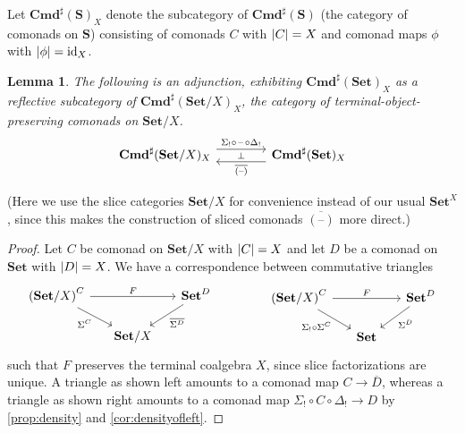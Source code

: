 \documentclass[11pt, oneside, article]{memoir}
\theoremstyle{plain}
\newtheorem{lemma}[theorem]{Lemma}
\theoremstyle{definition}
\theoremstyle{remark}
\DeclareMathOperator{\id}{id}
\DeclarePairedDelimiter{\abs}{\lvert}{\rvert}
\newcommand{\dash}{{\mathord{\text{--}}}}
\newcommand{\bang}{\mathrm{!}}
\newcommand{\namedcat}[1]{\mathbf{#1}}
\newcommand{\cat}[1]{\mathbf{#1}}
\newcommand{\Set}{\namedcat{Set}}
\newcommand{\Com}{\namedcat{Cmd}^\sharp}
\newcommand{\CoalgOn}[2]{{#2}^{#1}}
\newcommand{\CoalgSet}[1]{\CoalgOn{#1}{\Set}}
\newcommand{\clift}[1]{\overline{#1}}
\newcommand{\pts}[1]{{\abs{#1}}}
\newcommand{\qpts}[1]{\pts{#1}}
\newcommand{\one}[1]{\pts{#1}}
\newcommand{\ptlift}[1]{\overline{#1}}
\newcommand{\carr}{\Sigma}
\newcommand{\slicel}{\Sigma_\bang}
\newcommand{\slicer}{\Delta_\bang}
\newcommand{\car}[1]{\carr^{#1}}
\newcommand{\carC}{\car{\cC}}
\newcommand{\carD}{\car{\cD}}
\newcommand{\com}[2]{{#1}^{#2}}
\newcommand{\cmnd}[1]{{#1}}
\newcommand{\xX}{X}
\newcommand{\cC}{\cmnd{C}}
\newcommand{\cD}{\cmnd{D}}
\newcommand{\bS}{\cat{S}}
\newcommand{\DSet}{\CoalgSet{\cD}}
\newcommand{\slice}{slice}
\begin{document}
Let $\Com(\bS)_\xX$ denote the subcategory of $\Com(\bS)$ (the
category of comonads on $\bS$) consisting of comonads $\cC$ with
$\qpts{\cC} = \xX$ and comonad maps $\phi$ with
$\one{\phi} = \id_\xX$.

\begin{lemma}\label{lem:objectivereflective}
  The following is an adjunction, exhibiting $\Com(\Set)_\xX$ as a
  reflective subcategory of $\Com(\Set/\xX)_\xX$, the category of
  terminal-object-preserving comonads on $\Set/\xX$.
  \[
    \begin{tikzcd}[column sep=40pt]
      \Com(\Set/\xX)_\xX\ar[r, shift left=5pt, "\slicel\circ\, \dash\, \circ \slicer"]\ar["\bot"{anchor=center},r,draw=none]&
      \Com(\Set)_\xX\ar[l, shift left=5pt, "\clift{(\dash)}"]
    \end{tikzcd}
  \]
\end{lemma}

(Here we use the slice categories $\Set/X$ for convenience instead of
our usual $\Set^X$, since this makes the construction of sliced
comonads $\clift{(\dash)}$ more direct.)

\begin{proof}
  Let $\cC$ be comonad on $\Set/\xX$ with $\pts{\cC} = \xX$ and let
  $\cD$ be a comonad on $\Set$ with $\pts{\cD} = \xX$. We have a
  correspondence between commutative triangles
  \[
    \begin{tikzcd}[column sep=15pt, row sep=15pt]
      \CoalgOn{\cC}{(\Set/\xX)}\ar[rr, "F"]\ar[dr, "\carC"']&&\DSet\ar[dl, "\ptlift{\carD}"]\\
      &\Set/\xX
    \end{tikzcd}
    \qquad\qquad
    \begin{tikzcd}[column sep=15pt, row sep=15pt]
      \CoalgOn{\cC}{(\Set/\xX)}\ar[rr, "F"]\ar[dr, "\slicel\circ \carC"']&&\DSet\ar[dl, "\carD"]\\
      &\Set
    \end{tikzcd}
  \]
  such that $F$ preserves the terminal coalgebra $\xX$, since {\slice}
  factorizations are unique. A triangle as shown left amounts to a
  comonad map $\cC \to \clift{\cD}$, whereas a triangle as shown right
  amounts to a comonad map $\slicel\circ \cC \circ \slicer \to \cD$ by
  \cref{prop:density} and \cref{cor:densityofleft}.
\end{proof}
\end{document}
